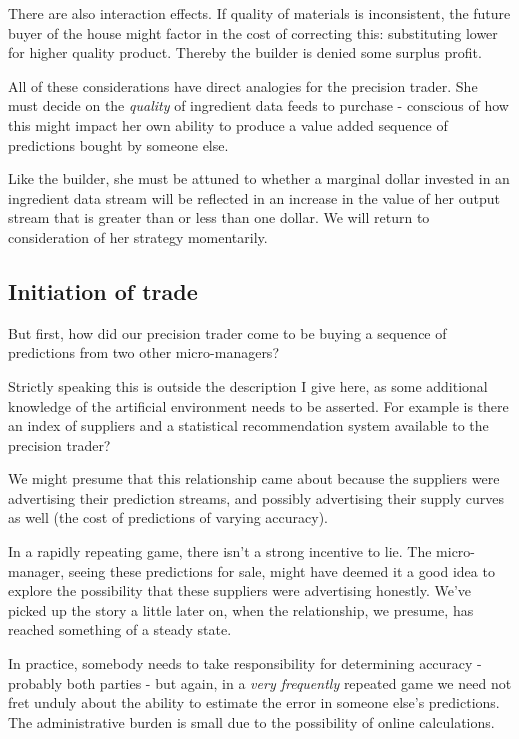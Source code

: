 There are also interaction effects. If quality of materials is inconsistent, the future buyer of the house might factor in the cost of correcting this: substituting lower for higher quality product. Thereby the builder is denied some surplus profit. 

All of these considerations have direct analogies for the precision trader. She must decide on the {\em quality} of ingredient data feeds to purchase - conscious of how this might impact her own ability to produce a value added sequence of predictions bought by someone else. 

Like the builder, she must be attuned to whether a marginal dollar invested in an ingredient data stream will be reflected in an increase in the value of her output stream that is greater than or less than one dollar.  We will return to consideration of her strategy momentarily. 

\subsection{Initiation of trade}

But first, how did our precision trader come to be buying a sequence of predictions from two other micro-managers? 

Strictly speaking this is outside the description I give here, as some additional knowledge of the artificial environment needs to be asserted. For example is there an index of suppliers and a statistical recommendation system available to the precision trader?  


We might presume that this relationship came about because the suppliers were advertising their prediction streams, and possibly advertising their supply curves as well (the cost of predictions of varying accuracy).  


In a rapidly repeating game, there isn't a strong incentive to lie. The micro-manager, seeing these predictions for sale, might have deemed it a good idea to explore the possibility that these suppliers were advertising honestly. We've picked up the story a little later on, when the relationship, we presume, has reached something of a steady state. 


In practice, somebody needs to take responsibility for determining accuracy - probably both parties - but again, in a {\em very frequently} repeated game we need not fret unduly about the ability to estimate the error in someone else's predictions. The administrative burden is small due to the possibility of online calculations.


